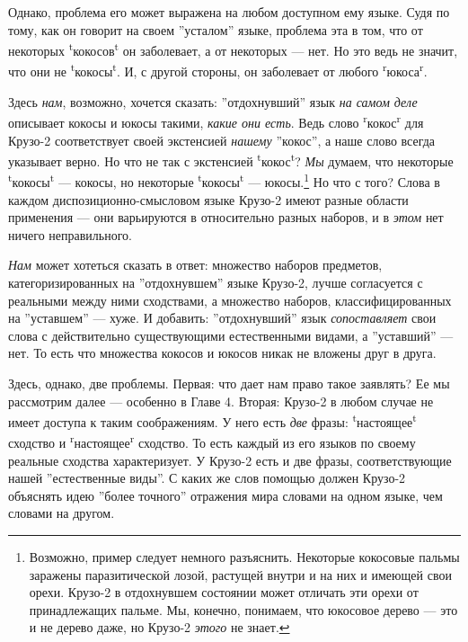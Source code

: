 \documentclass[11pt]{book}
\begin{document}
Однако, проблема его может выражена на любом доступном ему языке. Судя по тому, как он говорит на своем ''усталом'' языке, проблема эта в том, что от некоторых \textsuperscript{t}кокосов\textsuperscript{t} он заболевает, а от некоторых --- нет. Но это ведь не значит, что они не \textsuperscript{t}кокосы\textsuperscript{t}. И, с другой стороны, он заболевает от любого \textsuperscript{r}юкоса\textsuperscript{r}.

Здесь \textit{нам}, возможно, хочется сказать: ''отдохнувший'' язык \textit{на самом деле} описывает кокосы и юкосы такими, \textit{какие они есть}. Ведь слово \textsuperscript{r}кокос\textsuperscript{r} для Крузо-2 соответствует своей экстенсией \textit{нашему} ''кокос'', а наше слово всегда указывает верно. Но что не так с экстенсией \textsuperscript{t}кокос\textsuperscript{t}? \textit{Мы} думаем, что некоторые \textsuperscript{t}кокосы\textsuperscript{t} --- кокосы, но некоторые \textsuperscript{t}кокосы\textsuperscript{t} --- юкосы.\footnote{Возможно, пример следует немного разъяснить. Некоторые кокосовые пальмы заражены паразитической лозой, растущей внутри и на них и имеющей свои орехи. Крузо-2 в отдохнувшем состоянии может отличать эти орехи от принадлежащих пальме. Мы, конечно, понимаем, что юкосовое дерево --- это и не дерево даже, но Крузо-2 \textit{этого} не знает.} Но что с того? Слова в каждом диспозиционно-смысловом языке Крузо-2 имеют разные области применения --- они варьируются в относительно разных наборов, и в \textit{этом} нет ничего неправильного.

\textit{Нам} может хотеться сказать в ответ: множество наборов предметов, категоризированных на ''отдохнувшем'' языке Крузо-2, лучше согласуется с реальными между ними сходствами, а множество наборов, классифицированных на ''уставшем'' --- хуже. И добавить: ''отдохнувший'' язык \textit{сопоставляет} свои слова с действительно существующими естественными видами, а ''уставший'' --- нет. То есть что множества кокосов и юкосов никак не вложены друг в друга.

Здесь, однако, две проблемы. Первая: что дает нам право такое заявлять? Ее мы рассмотрим далее --- особенно в Главе 4. Вторая: Крузо-2 в любом случае не имеет доступа к таким соображениям. У него есть \textit{две} фразы: \textsuperscript{t}настоящее\textsuperscript{t} сходство и \textsuperscript{r}настоящее\textsuperscript{r} сходство. То есть каждый из его языков по своему реальные сходства характеризует. У Крузо-2 есть и две фразы, соответствующие нашей ''естественные виды''. С каких же слов помощью должен Крузо-2 объяснять идею ''более точного'' отражения мира словами на одном языке, чем словами на другом.
\end{document}
